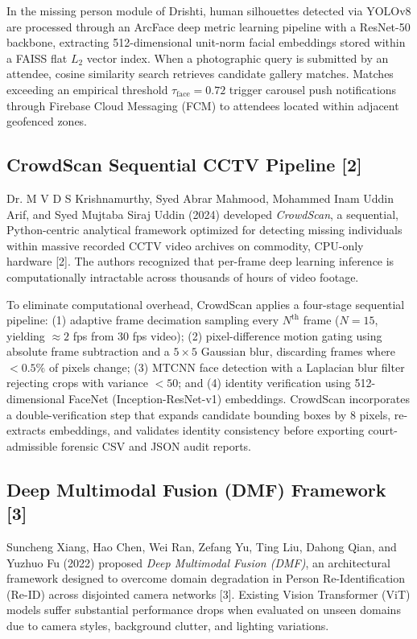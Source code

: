 \documentclass[12pt,a4paper]{report}
\begin{document}
In the missing person module of Drishti, human silhouettes detected via YOLOv8 are processed through an ArcFace deep metric learning pipeline with a ResNet-50 backbone, extracting 512-dimensional unit-norm facial embeddings stored within a FAISS flat $L_2$ vector index. When a photographic query is submitted by an attendee, cosine similarity search retrieves candidate gallery matches. Matches exceeding an empirical threshold $\tau_{\text{face}} = 0.72$ trigger carousel push notifications through Firebase Cloud Messaging (FCM) to attendees located within adjacent geofenced zones.

\subsection{CrowdScan Sequential CCTV Pipeline [2]}
Dr. M V D S Krishnamurthy, Syed Abrar Mahmood, Mohammed Inam Uddin Arif, and Syed Mujtaba Siraj Uddin (2024) developed \textit{CrowdScan}, a sequential, Python-centric analytical framework optimized for detecting missing individuals within massive recorded CCTV video archives on commodity, CPU-only hardware [2]. The authors recognized that per-frame deep learning inference is computationally intractable across thousands of hours of video footage.

To eliminate computational overhead, CrowdScan applies a four-stage sequential pipeline: (1) adaptive frame decimation sampling every $N^{\text{th}}$ frame ($N=15$, yielding $\approx 2$ fps from 30 fps video); (2) pixel-difference motion gating using absolute frame subtraction and a $5\times5$ Gaussian blur, discarding frames where $<0.5\%$ of pixels change; (3) MTCNN face detection with a Laplacian blur filter rejecting crops with variance $<50$; and (4) identity verification using 512-dimensional FaceNet (Inception-ResNet-v1) embeddings. CrowdScan incorporates a double-verification step that expands candidate bounding boxes by 8 pixels, re-extracts embeddings, and validates identity consistency before exporting court-admissible forensic CSV and JSON audit reports.

\subsection{Deep Multimodal Fusion (DMF) Framework [3]}
Suncheng Xiang, Hao Chen, Wei Ran, Zefang Yu, Ting Liu, Dahong Qian, and Yuzhuo Fu (2022) proposed \textit{Deep Multimodal Fusion (DMF)}, an architectural framework designed to overcome domain degradation in Person Re-Identification (Re-ID) across disjointed camera networks [3]. Existing Vision Transformer (ViT) models suffer substantial performance drops when evaluated on unseen domains due to camera styles, background clutter, and lighting variations.
\end{document}
